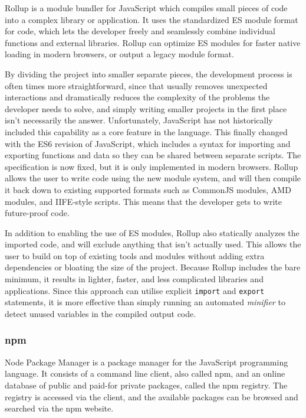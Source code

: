 \documentclass[english,engineering]{wizthesis}
\newcommand{\paraphrase}[1]{#1}
\begin{document}
\paraphrase{Rollup \cite{rollup} is a module bundler for JavaScript which
compiles small pieces of code into a complex library or application. It uses the
standardized ES module format for code, which lets the developer freely and
seamlessly combine individual functions and external libraries. Rollup can
optimize ES modules for faster native loading in modern browsers, or output a
legacy module format.

By dividing the project into smaller separate pieces, the development process is
often times more straightforward, since that usually removes unexpected
interactions and dramatically reduces the complexity of the problems the
developer needs to solve, and simply writing smaller projects in the first place
isn't necessarily the answer. Unfortunately, JavaScript has not historically
included this capability as a core feature in the language. This finally changed
with the ES6 revision of JavaScript, which includes a syntax for importing and
exporting functions and data so they can be shared between separate scripts. The
specification is now fixed, but it is only implemented in modern browsers.
Rollup allows the user to write code using the new module system, and will then
compile it back down to existing supported formats such as CommonJS modules, AMD
modules, and IIFE-style scripts. This means that the developer gets to write
future-proof code.

In addition to enabling the use of ES modules, Rollup also statically analyzes
the imported code, and will exclude anything that isn't actually used. This
allows the user to build on top of existing tools and modules without adding
extra dependencies or bloating the size of the project. Because Rollup includes
the bare minimum, it results in lighter, faster, and less complicated libraries
and applications. Since this approach can utilise explicit \texttt{import} and
\texttt{export} statements, it is more effective than simply running an
automated \emph{minifier} to detect unused variables in the compiled output
code.}

\subsubsection*{npm}

\paraphrase{Node Package Manager is a package manager for the JavaScript
programming language. It consists of a command line client, also called npm, and
an online database of public and paid-for private packages, called the npm
registry. The registry is accessed via the client, and the available packages
can be browsed and searched via the npm website.}
\end{document}
